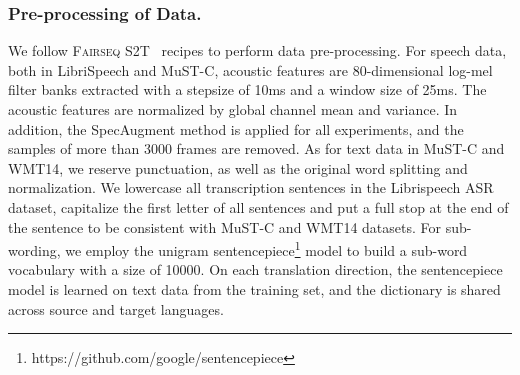 \documentclass[letterpaper]{article} %
\begin{document}
\subsubsection*{Pre-processing of Data.} 
We follow \textsc{Fairseq} S2T~\cite{Wang2020FairseqSF} recipes to perform data pre-processing. 
For speech data, both in LibriSpeech and MuST-C, acoustic features are 80-dimensional log-mel filter banks extracted with a stepsize of 10ms and a window size of 25ms. 
The acoustic features are normalized by global channel mean and variance. 
In addition, the SpecAugment method \cite{Park2019SpecAugmentAS} is applied for all experiments, and the samples of more than 3000 frames are removed. 
As for text data in MuST-C and WMT14, we reserve punctuation, as well as the original word splitting and normalization. 
We lowercase all transcription sentences in the Librispeech ASR dataset, capitalize the first letter of all sentences and put a full stop at the end of the sentence to be consistent with MuST-C and WMT14 datasets.
For sub-wording, we employ the unigram sentencepiece\footnote{https://github.com/google/sentencepiece} model to build a sub-word vocabulary with a size of 10000.
On each translation direction, the sentencepiece model is learned on text data from the training set, and the dictionary is shared across source and target languages.
\end{document}
